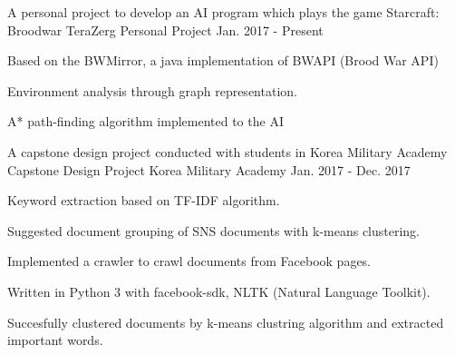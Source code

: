 


\begin{cventries}


\cventry
{A personal project to develop an AI program which plays the game Starcraft: Broodwar} %
{TeraZerg} %
{Personal Project} %
{Jan. 2017 - Present} %
{ %
\begin{cvitems}
\item {Based on the BWMirror, a java implementation of BWAPI (Brood War API)}
\item {Environment analysis through graph representation.}
\item {A* path-finding algorithm implemented to the AI}
\end{cvitems}
}


\cventry
{A capstone design project conducted with students in Korea Military Academy} %
{Capstone Design Project} %
{Korea Military Academy} %
{Jan. 2017 - Dec. 2017} %
{ %
\begin{cvitems}
\item {Keyword extraction based on TF-IDF algorithm.}
\item {Suggested document grouping of SNS documents with k-means clustering.}
\item {Implemented a crawler to crawl documents from Facebook pages.}
\item {Written in Python 3 with facebook-sdk, NLTK (Natural Language Toolkit).}
\item {Succesfully clustered documents by k-means clustring algorithm and extracted important words.}
\end{cvitems}
}



\end{cventries}
